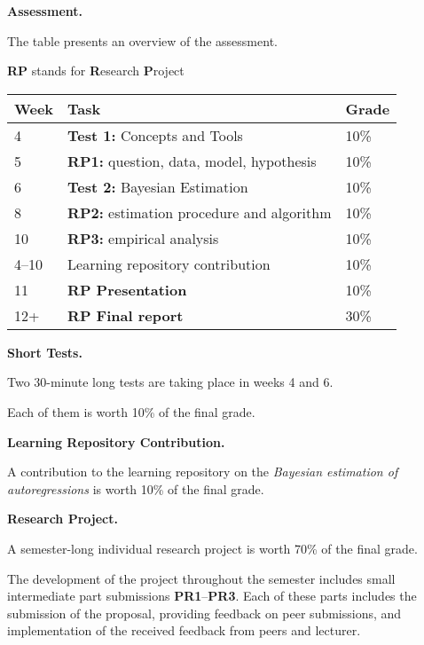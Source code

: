 \documentclass[10pt]{article}
\begin{document}
\begin{multicols}{2}

\bigskip\noindent\textbf{Assessment.} 

\smallskip\noindent The table presents an overview of the assessment. 

\smallskip\noindent \textbf{RP} stands for \textbf{R}esearch \textbf{P}roject

\begin{center}
\begin{tabular}{ l l l }
\toprule 
Week & Task & Grade \\[1ex]
\midrule
4 & \textbf{Test 1:} Concepts and Tools & 10\% \\ [1ex]
5 & \textbf{RP1:} question, data, model, hypothesis & 10\% \\[1ex]
6 & \textbf{Test 2:} Bayesian Estimation & 10\% \\[1ex]
8 & \textbf{RP2:} estimation procedure and algorithm & 10\% \\
10 & \textbf{RP3:} empirical analysis & 10\% \\[1ex]
4--10 & Learning repository contribution & 10\% \\ [1ex]
11 & \textbf{RP Presentation} &  10\% \\[1ex]
12+ & \textbf{RP Final report} & 30\%   \\[1ex]
\bottomrule
\end{tabular}
\end{center}

\smallskip\noindent\textbf{Short Tests.}

\smallskip\noindent Two 30-minute long tests are taking place in weeks 4 and  6. 

\smallskip\noindent Each of them is worth 10\% of the final grade.

\smallskip\noindent\textbf{Learning Repository Contribution.}

\smallskip\noindent A contribution to the learning repository on the \textit{Bayesian estimation of autoregressions} is worth 10\% of the final grade.

\smallskip\noindent\textbf{Research Project.}

\smallskip\noindent A semester-long individual research project is worth 70\% of the final grade.

\smallskip\noindent The development of the project throughout the semester includes small intermediate part submissions \textbf{PR1}--\textbf{PR3}. Each of these parts includes the submission of the proposal, providing feedback on peer submissions, and implementation of the received feedback from peers and lecturer.


\end{multicols}
\end{document}
